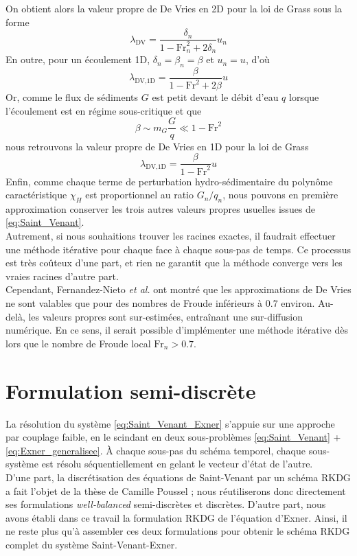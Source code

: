 \documentclass[11pt, a4paper, oneside]{report}
\begin{document}
On obtient alors la valeur propre de De Vries en 2D pour la loi de Grass sous la forme
\begin{equation}
    \lambda_\text{DV} = \frac{\delta_n}{1 - \text{Fr}_n^2 + 2 \delta_n} u_n
\end{equation}
En outre, pour un écoulement 1D, $\delta_n = \beta_n = \beta$ et $u_n = u$, d'où
\begin{equation}
    \lambda_\text{DV,1D} = \frac{\beta}{1 - \text{Fr}^2 + 2 \beta} u
\end{equation}
Or, comme le flux de sédiments $G$ est petit devant le débit d'eau $q$ lorsque l'écoulement est en régime sous-critique et que
\begin{equation}
    \beta \sim m_G \frac{G}{q} \ll 1 - \text{Fr}^2
\end{equation}
nous retrouvons la valeur propre de De Vries en 1D pour la loi de Grass \cite{fernandez2025third, vries1965considerations}
\begin{equation}
    \lambda_\text{DV,1D} = \frac{\beta}{1 - \text{Fr}^2} u
\end{equation}
Enfin, comme chaque terme de perturbation hydro-sédimentaire du polynôme caractéristique $\chi_H$ est proportionnel au ratio $G_n/q_n$, nous pouvons en première approximation conserver les trois autres valeurs propres usuelles issues de \eqref{eq:Saint_Venant}. \\
Autrement, si nous souhaitions trouver les racines exactes, il faudrait effectuer une méthode itérative pour chaque face à chaque sous-pas de temps. Ce processus est très coûteux d'une part, et rien ne garantit que la méthode converge vers les vraies racines d'autre part. \\
Cependant, Fernandez-Nieto \textit{et al.} \cite{fernandez2025third} ont montré que les approximations de De Vries ne sont valables que pour des nombres de Froude inférieurs à $0.7$ environ. Au-delà, les valeurs propres sont sur-estimées, entraînant une sur-diffusion numérique. En ce sens, il serait possible d'implémenter une méthode itérative dès lors que le nombre de Froude local $\text{Fr}_n > 0.7$.

\section{Formulation semi-discrète}

La résolution du système \eqref{eq:Saint_Venant_Exner} s'appuie sur une approche par couplage faible, en le scindant en deux sous-problèmes \eqref{eq:Saint_Venant} + \eqref{eq:Exner_generalisee}. À chaque sous-pas du schéma temporel, chaque sous-système est résolu séquentiellement en gelant le vecteur d'état de l'autre. \\
D'une part, la discrétisation des équations de Saint-Venant par un schéma RKDG a fait l'objet de la thèse de Camille Poussel \cite{poussel2024dynamique} ; nous réutiliserons donc directement ses formulations \textit{well-balanced} semi-discrètes et discrètes. D'autre part, nous avons établi dans ce travail la formulation RKDG de l'équation d'Exner. Ainsi, il ne reste plus qu'à assembler ces deux formulations pour obtenir le schéma RKDG complet du système Saint-Venant-Exner. \\
\end{document}
